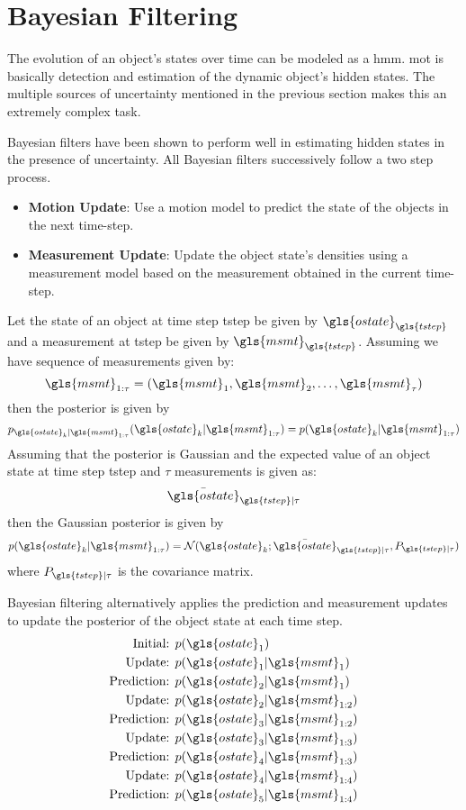 \documentclass[a4paper]{article}
\begin{document}
\section{Bayesian Filtering}%
The evolution of an object's states over time can be modeled as a \gls{hmm}. \gls{mot} is basically detection and estimation of the dynamic object's hidden states. The multiple sources of uncertainty mentioned in the previous section makes this an extremely complex task.\par
Bayesian filters have been shown to perform well in estimating hidden states in the presence of uncertainty. All Bayesian filters successively follow a two step process.
\begin{itemize}
	\item \textbf{Motion Update}: Use a motion model to predict the state of the objects in the next time-step.
	\item \textbf{Measurement Update}: Update the object state's densities using a measurement model based on the measurement obtained in the current time-step.
\end{itemize}
Let the state of an object at time step \gls{tstep} be given by $\gls{ostate}_{\gls{tstep}}$ and a measurement at \gls{tstep} be given by $\gls{msmt}_{\gls{tstep}}$. Assuming we have sequence of measurements given by:
$$\gls{msmt}_{1:\tau}=(\gls{msmt}_1,\gls{msmt}_2,\dots,\gls{msmt}_\tau)$$
then the posterior is given by
$$p_{\gls{ostate}_k | \gls{msmt}_{1:\tau}}(\gls{ostate}_k | \gls{msmt}_{1:\tau}) = p(\gls{ostate}_k | \gls{msmt}_{1:\tau})$$
Assuming that the posterior is Gaussian and the expected value of an object state at time step \gls{tstep} and $\tau$ measurements is given as:
$$\bar{\gls{ostate}}_{\gls{tstep}|\tau}$$
then the Gaussian posterior is given by
$$p(\gls{ostate}_k | \gls{msmt}_{1:\tau})=\mathcal{N}(\gls{ostate}_k ; \bar{\gls{ostate}}_{\gls{tstep}|\tau},P_{\gls{tstep}|\tau})$$
where $P_{\gls{tstep}|\tau}$ is the covariance matrix.\par
Bayesian filtering alternatively applies the prediction and measurement updates to update the posterior of the object state at each time step.
\begin{align}
	\text{Initial: }&p(\gls{ostate}_1)\nonumber\\
	\text{Update: }&p(\gls{ostate}_1 | \gls{msmt}_1)\nonumber\\
	\text{Prediction: }&p(\gls{ostate}_2 | \gls{msmt}_1)\nonumber\\
	\text{Update: }&p(\gls{ostate}_2 | \gls{msmt}_{1:2})\nonumber\\
	\text{Prediction: }&p(\gls{ostate}_3 | \gls{msmt}_{1:2})\nonumber\\
	\text{Update: }&p(\gls{ostate}_3 | \gls{msmt}_{1:3})\nonumber\\
	\text{Prediction: }&p(\gls{ostate}_4 | \gls{msmt}_{1:3})\nonumber\\
	\text{Update: }&p(\gls{ostate}_4 | \gls{msmt}_{1:4})\nonumber\\
	\text{Prediction: }&p(\gls{ostate}_5 | \gls{msmt}_{1:4})\nonumber
\end{align}
\end{document}
